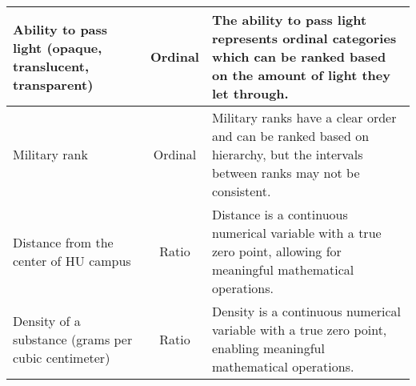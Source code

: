 \documentclass{article}
\begin{document}
\begin{tabular}{|p{2cm}|c|p{10cm}|}
    \hline
    Ability to pass light (opaque, translucent, transparent) & Ordinal            & The ability to pass light represents ordinal categories which can be ranked based on the amount of light they let through.                              \\
    \hline
    Military rank                                            & Ordinal            & Military ranks have a clear order and can be ranked based on hierarchy, but the intervals between ranks may not be consistent.                          \\
    \hline
    Distance from the center of HU campus                    & Ratio              & Distance is a continuous numerical variable with a true zero point, allowing for meaningful mathematical operations.                                    \\
    \hline
    Density of a substance (grams per cubic centimeter)      & Ratio              & Density is a continuous numerical variable with a true zero point, enabling meaningful mathematical operations.                                         \\
    \hline
\end{tabular}
\end{document}
